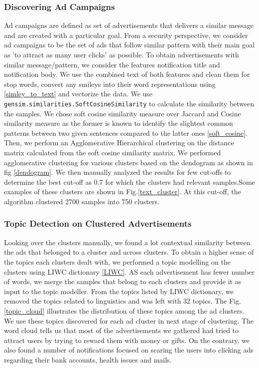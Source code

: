 \subsubsection{Discovering Ad Campaigns}
Ad campaigns are defined as set of advertisements that delivers a similar message and are created with a particular goal. From a security perspective, we consider ad campaigns to be the set of ads that follow similar pattern with their main goal as 'to attract as many user clicks' as possible. To obtain advertisements with similar message/pattern, we consider the features notification title and notification body. We use the combined text of both features and clean them for stop words, convert any smileys into their word representations using \ref{simley_to_text} and vectorize the data. We use \texttt{gensim.similarities.SoftCosineSimilarity} to calculate the similarity between the samples. We chose soft cosine similarity measure over Jaccard and Cosine similarity measure as the former is known to identify the slightest common patterns between two given sentences compared to the latter ones \ref{soft_cosine}. Then, we perform an Agglomerative Hierarchical clustering on the distance matrix calculated from the soft cosine similarity matrix. We performed agglomerative clustering for various clusters based on the dendogram as shown in fig \ref{dendogram}. We then manually analyzed the results for few cut-offs to determine the best cut-off as 0.7 for which the clusters had relevant samples.Some examples of these clusters are shown in Fig.\ref{text_cluster}.  At this cut-off, the algorithm clustered 2700 samples into 750 clusters. 




\subsubsection{Topic Detection on Clustered Advertisements}
Looking over the clusters manually, we found a lot contextual similarity between the ads that belonged to a cluster and across clusters. To obtain a higher sense of the topics each clusters dealt with, we performed a topic modelling on the clusters using LIWC dictionary \ref{LIWC}. AS each advertisement has fewer number of words, we merge the samples that belong to each clusters and provide it as input to the topic modeller. From the topics listed by LIWC dictionary, we removed the topics related to linguistics and was left with 32 topics. The Fig. \ref{topic_cloud} illustrates the distribution of these topics among the ad clusters. We use these topics discovered for each ad cluster in next stage of clustering. The word cloud tells us that most of the advertisements we gathered had tried to attract users by trying to reward them with money or gifts. On the contrary, we also found a number of notifications focused on scaring the users into clicking ads regarding their bank accounts, health issues and mails.

